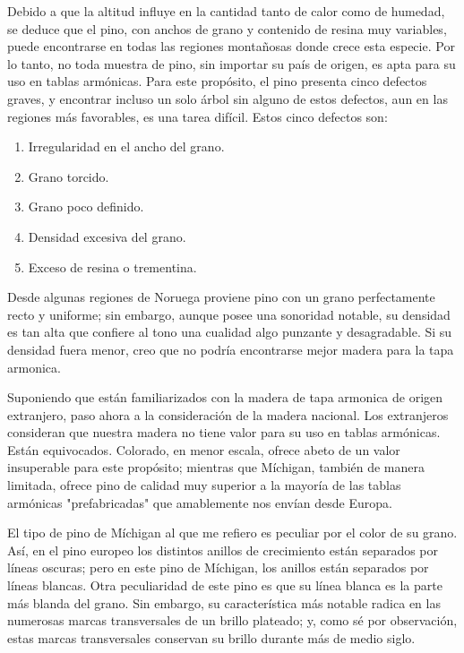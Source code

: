 \documentclass[12pt]{book}
\begin{document}
Debido a que la altitud influye en la cantidad tanto de calor como de humedad, se deduce que el pino, con anchos de grano y contenido de resina muy variables, puede encontrarse en todas las regiones montañosas donde crece esta especie. Por lo tanto, no toda muestra de pino, sin importar su país de origen, es apta para su uso en tablas armónicas. Para este propósito, el pino presenta cinco defectos graves, y encontrar incluso un solo árbol sin alguno de estos defectos, aun en las regiones más favorables, es una tarea difícil. Estos cinco defectos son:

\begin{enumerate}
    \item Irregularidad en el ancho del grano.
    \item Grano torcido.
    \item Grano poco definido.
    \item Densidad excesiva del grano.
    \item Exceso de resina o trementina.
\end{enumerate}

Desde algunas regiones de Noruega proviene pino con un grano perfectamente recto y uniforme; sin embargo, aunque posee una sonoridad notable, su densidad es tan alta que confiere al tono una cualidad algo punzante y desagradable. Si su densidad fuera menor, creo que no podría encontrarse mejor madera para la tapa armonica.

Suponiendo que están familiarizados con la madera de tapa armonica de origen extranjero, paso ahora a la consideración de la madera nacional. Los extranjeros consideran que nuestra madera no tiene valor para su uso en tablas armónicas. Están equivocados. Colorado, en menor escala, ofrece abeto de un valor insuperable para este propósito; mientras que Míchigan, también de manera limitada, ofrece pino de calidad muy superior a la mayoría de las tablas armónicas "prefabricadas" que amablemente nos envían desde Europa. 

El tipo de pino de Míchigan al que me refiero es peculiar por el color de su grano. Así, en el pino europeo los distintos anillos de crecimiento están separados por líneas oscuras; pero en este pino de Míchigan, los anillos están separados por líneas blancas. Otra peculiaridad de este pino es que su línea blanca es la parte más blanda del grano. Sin embargo, su característica más notable radica en las numerosas marcas transversales de un brillo plateado; y, como sé por observación, estas marcas transversales conservan su brillo durante más de medio siglo.
\end{document}
